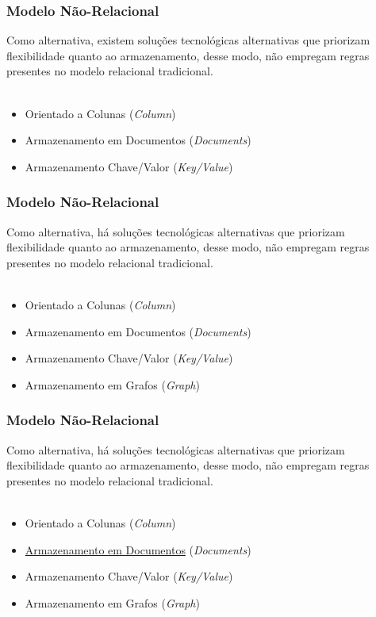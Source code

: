 \documentclass[aspectratio=169]{beamer}
\begin{document}
\begin{frame}
\frametitle{Modelo Não-Relacional}
\justifying
Como alternativa, existem soluções tecnológicas alternativas que priorizam flexibilidade quanto ao armazenamento, desse modo, não empregam regras presentes no modelo relacional tradicional.\\~\\
\begin{itemize}
\item Orientado a Colunas (\textit{Column})
\item Armazenamento em Documentos (\textit{Documents})
\item Armazenamento Chave/Valor (\textit{Key/Value})
\end{itemize}
\end{frame}

\begin{frame}
\frametitle{Modelo Não-Relacional}
\justifying
Como alternativa, há soluções tecnológicas alternativas que priorizam flexibilidade quanto ao armazenamento, desse modo, não empregam regras presentes no modelo relacional tradicional.\\~\\
\begin{itemize}
\item Orientado a Colunas (\textit{Column})
\item Armazenamento em Documentos (\textit{Documents})
\item Armazenamento Chave/Valor (\textit{Key/Value})
\item Armazenamento em Grafos (\textit{Graph})
\end{itemize}

\end{frame}

\begin{frame}
\frametitle{Modelo Não-Relacional}
\justifying
Como alternativa, há soluções tecnológicas alternativas que priorizam flexibilidade quanto ao armazenamento, desse modo, não empregam regras presentes no modelo relacional tradicional.\\~\\
\begin{itemize}
\item Orientado a Colunas (\textit{Column})
\item \underline{Armazenamento em Documentos} (\textit{Documents})
\item Armazenamento Chave/Valor (\textit{Key/Value})
\item Armazenamento em Grafos (\textit{Graph})
\end{itemize}

\end{frame}
\end{document}
